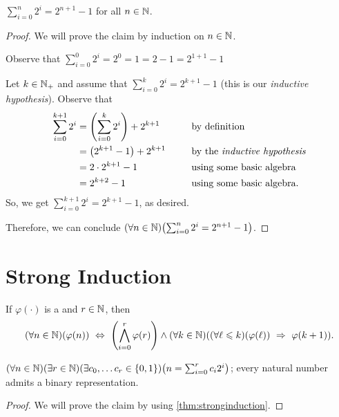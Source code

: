 \begin{lemma}
    $\displaystyle \sum_{i = 0}^{n}2^i = 2^{n + 1} - 1$ for all $n \in \mathbb{N}$.
\end{lemma}
\begin{proof}
    We will prove the claim by induction on $n \in \mathbb{N}$.
    \begin{case}
        Observe that $\displaystyle \sum_{i = 0}^{0}2^i = 2^0 = 1 = 2 - 1 = 2^{1 + 1} - 1$
    \end{case}
    \begin{case}
        Let $k \in \mathbb{N}_+$ and assume that $\displaystyle \sum_{i = 0}^{k}2^i = 2^{k + 1} - 1$
        (this is our \emph{inductive hypothesis}).
        Observe that
        \begin{alignat*}{2}
            \sum_{i = 0}^{k + 1}2^i &= \pn*{\sum_{i = 0}^{k}2^i} + 2^{k + 1} &&\text{ by definition} \\
                                    &= \pn*{2^{k + 1} - 1} + 2^{k + 1}~~~~&&\text{ by the \emph{inductive hypothesis}} \\
                                    &= 2 \cdot 2^{k + 1} - 1 &&\text{ using some basic algebra} \\
                                    &= 2^{k + 2} - 1 &&\text{ using some basic algebra}.
        \end{alignat*}
        So, we get $\displaystyle \sum_{i = 0}^{k + 1}2^i = 2^{k + 1} - 1$, as desired.
    \end{case}
    Therefore, we can conclude $\pn*{\forall n \in \N}\pn*{\sum_{i = 0}^{n}2^i = 2^{n + 1} - 1}$.
\end{proof}

\section{Strong Induction}
\begin{theorem}\label{thm:stronginduction}
    If $\varphi(\cdot)$ is a {\wff} and $r \in \mathbb{N}$, then
    \[
        \pn*{\forall n \in \N}\pn*{\varphi(n)}
        \iff \pn*{\bigmeet_{i = 0}^{r}\varphi(r)}
        \meet \pn*{\forall k \in \N}\pn*{\pn*{\forall \ell \leq k}\pn*{\varphi(\ell)} \implies \varphi(k + 1)}.
    \]
\end{theorem}

\begin{lemma}
    $\pn*{\forall n \in \N}\pn*{\exists r \in \N}\pn*{\exists c_0, \dots c_r \in \set*{0, 1}}\pn*{n = \sum_{i = 0}^{r}c_i 2^i}$;
    \ie every natural number admits a binary representation.
\end{lemma}
\begin{proof}
    We will prove the claim by using \autoref{thm:stronginduction}.
\end{proof}


